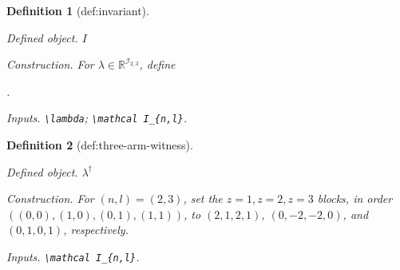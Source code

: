 \documentclass{article}
\newtheorem{definition}{Definition}
\begin{document}
\begin{definition}[def:invariant]\label{def:invariant}
\par\smallskip\noindent\emph{Defined object.} \(I\)
\par\smallskip\noindent\emph{Construction.} For \(\lambda\in\mathbb R^{\mathcal I_{2,3}}\), define \par\noindent {}\par\noindent.
\par\smallskip\noindent\emph{Inputs.} \texttt{\textbackslash{}\allowbreak{}lambda}; \texttt{\textbackslash{}\allowbreak{}mathcal I\_\allowbreak{}\{n,\allowbreak{}l\}\allowbreak{}}.
\end{definition}

\begin{definition}[def:three-arm-witness]\label{def:three-arm-witness}
\par\smallskip\noindent\emph{Defined object.} \(\lambda^\dagger\)
\par\smallskip\noindent\emph{Construction.} For \((n,l)=(2,3)\), set the \(z=1,z=2,z=3\) blocks, in order \(((0,0),(1,0),(0,1),(1,1))\), to \((2,1,2,1)\), \((0,-2,-2,0)\), and \((0,1,0,1)\), respectively.
\par\smallskip\noindent\emph{Inputs.} \texttt{\textbackslash{}\allowbreak{}mathcal I\_\allowbreak{}\{n,\allowbreak{}l\}\allowbreak{}}.
\end{definition}
\end{document}
